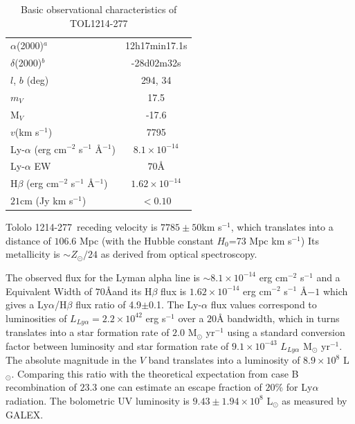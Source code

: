 \documentclass[a4paper, usenatbib, 12pt]{article}
\newcommand{\tol}{Tololo 1214-277}
\begin{document}
{\begin{table}
\begin{center}
\begin{tabular}{lc}
$\alpha$(2000)$^{a}$ & 12h17min17.1s\\
$\delta$(2000)$^{b}$ & -28d02m32s\\
$l$, $b$ (deg) & 294, 34\\
$m_V$ & 17.5\\
  M$_V$ & -17.6\\ 
$v$(km s$^{-1}$) & 7795\\
Ly-$\alpha$ (erg cm$^{-2}$ s$^{-1}$ \AA$^{-1}$)& $8.1\times 10^{-14}$ \\
Ly-$\alpha$ EW & $70$\AA\\
H$\beta$ (erg cm$^{-2}$ s$^{-1}$ \AA$^{-1}$) & $1.62\times 10^{-14}$ \\
$21$cm (Jy km s$^{-1}$)& $<0.10$ \\
\end{tabular}
\end{center}
\caption{Basic observational characteristics of TOL1214-277
  \cite{Thuan97}\\} 
\end{table}


\tol\ receding velocity is $7785\pm 50$km s$^{-1}$, which translates
into a distance of $106.6$ Mpc (with the Hubble constant $H_{0}$=73
Mpc km s$^{-1}$) 
Its metallicity is $\sim Z_{\odot}/24$ \cite{Izotov04} as derived from optical
spectroscopy. 


The observed flux for the Lyman alpha line is $\sim
8.1\times 10^{-14}$ erg cm$^{-2}$ s$^{-1}$ \cite{Thuan97}
and a Equivalent Width of $70$\AA and its H$\beta$ flux is 
$1.62\times 10^{-14}$ erg cm$^{-2}$ s$^{-1}$ \AA${-1}$
\cite{Izotov04} which gives a Ly$\alpha$/H$\beta$ flux ratio of
4.9$\pm$0.1. The Ly-$\alpha$ flux values correspond to luminosities of
$L_{Ly\alpha}=2.2\times 10^{42}$ erg s$^{-1}$ over a $20$\AA
bandwidth, which in turns translates  into a star formation rate of
$2.0$ M$_{\odot}$ yr$^{-1}$ using a standard conversion factor between
luminosity and star formation rate of $9.1\times 10^{-43}$
$L_{Ly\alpha}$ M$_{\odot}$ yr$^{-1}$. 
The absolute magnitude in the $V$ band translates into a luminosity of
$8.9\times 10^{8}$ L$_{\odot}$.
Comparing this ratio with the theoretical expectation from case B
recombination of $23.3$ \cite{Hummer1987} one can estimate an escape
fraction of $20$\% for Ly$\alpha$ radiation.
The bolometric UV luminosity is $9.43\pm1.94 \times 10^{8}$
L$_{\odot}$ as measured by GALEX. 

}
\end{document}
